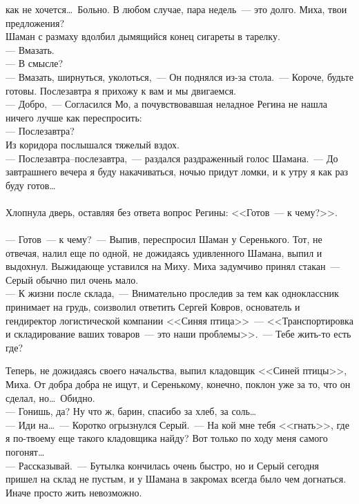 как не хочется\ldots\ Больно. В любом случае, пара недель~--- это долго. Миха, твои 
предложения?\\
Шаман с размаху вдолбил дымящийся конец сигареты в тарелку.\\
--- Вмазать.\\
--- В смысле?\\
--- Вмазать, ширнуться, уколоться,~--- Он поднялся из-за стола.~--- Короче, 
будьте готовы. Послезавтра я прихожу к вам и мы двигаемся.\\
--- Добро,~--- Согласился Мо, а почувствовавшая неладное Регина не нашла ничего 
лучше как переспросить:\\
--- Послезавтра?\\
Из коридора послышался тяжелый вздох. \\
--- Послезавтра--послезавтра,~--- раздался раздраженный голос Шамана.~--- До 
завтрашнего вечера я буду накачиваться, ночью придут ломки, и к утру я как раз 
буду готов\ldots\\
\\
Хлопнула дверь, оставляя без ответа вопрос Регины: <<Готов~--- к чему?>>. \\
~\\

\noindent --- Готов~--- к чему?~--- Выпив, переспросил Шаман у Серенького. Тот, не отвечая, 
налил еще по одной, не дожидаясь удивленного Шамана, выпил и выдохнул. 
Выжидающе уставился на Миху. Миха задумчиво принял стакан~--- Серый обычно пил очень мало.\\
--- К жизни после склада,~--- Внимательно проследив за тем как одноклассник 
принимает на грудь, соизволил ответить Сергей Ковров, основатель и гендиректор 
логистической компании <<Синяя птица>>~--- <<Транспортировка и складирование 
ваших товаров~--- это наши проблемы>>.~--- Тебе жить-то есть где?

Теперь, не дожидаясь своего начальства, выпил кладовщик <<Синей птицы>>, Миха. 
От добра добра не ищут, и Серенькому, конечно, поклон уже за то, что он сделал, 
но\ldots\ Обидно. \\
--- Гонишь, да? Ну что ж, барин, спасибо за хлеб, за соль\ldots\\
--- Иди на\ldots~--- Коротко огрызнулся Серый.~--- На кой мне тебя <<гнать>>, где 
я по-твоему еще такого кладовщика найду? Вот только по ходу меня самого 
погонят\ldots\\
--- Рассказывай.~--- Бутылка кончилась очень быстро, но и Серый сегодня пришел на 
склад не пустым, и у Шамана в закромах всегда было чем догнаться. Иначе просто 
жить невозможно.

